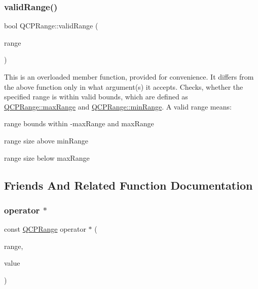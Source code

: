 \subsubsection{\texorpdfstring{validRange()}{validRange()}\hspace{0.1cm}{\footnotesize\ttfamily [2/2]}}
{\footnotesize\ttfamily bool Q\+C\+P\+Range\+::valid\+Range (\begin{DoxyParamCaption}\item[{const \mbox{\hyperlink{class_q_c_p_range}{Q\+C\+P\+Range}} \&}]{range }\end{DoxyParamCaption})\hspace{0.3cm}{\ttfamily [static]}}

This is an overloaded member function, provided for convenience. It differs from the above function only in what argument(s) it accepts. Checks, whether the specified range is within valid bounds, which are defined as \mbox{\hyperlink{class_q_c_p_range_a5ca51e7a2dc5dc0d49527ab171fe1f4f}{Q\+C\+P\+Range\+::max\+Range}} and \mbox{\hyperlink{class_q_c_p_range_ab46d3bc95030ee25efda41b89e2b616b}{Q\+C\+P\+Range\+::min\+Range}}. A valid range means\+: \begin{DoxyItemize}
\item range bounds within -\/max\+Range and max\+Range \item range size above min\+Range \item range size below max\+Range \end{DoxyItemize}


\subsection{Friends And Related Function Documentation}
\mbox{\label{class_q_c_p_range_aa28aa343c7cc247ea00d26d9dcbac75f}} 
\subsubsection{\texorpdfstring{operator $\ast$}{operator *}\hspace{0.1cm}{\footnotesize\ttfamily [1/2]}}
{\footnotesize\ttfamily const \mbox{\hyperlink{class_q_c_p_range}{Q\+C\+P\+Range}} operator $\ast$ (\begin{DoxyParamCaption}\item[{const \mbox{\hyperlink{class_q_c_p_range}{Q\+C\+P\+Range}} \&}]{range,  }\item[{double}]{value }\end{DoxyParamCaption})\hspace{0.3cm}{\ttfamily [friend]}}

